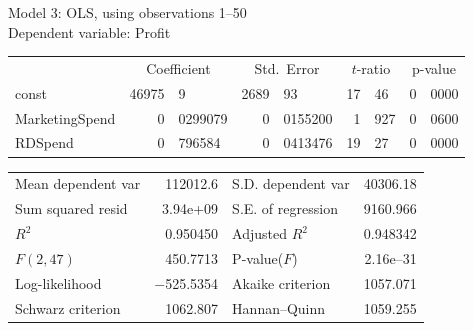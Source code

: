 \documentclass[11pt]{article}
\begin{document}
\thispagestyle{empty}

\begin{center}

Model 3: OLS, using observations 1--50\\
Dependent variable: Profit\\

\vspace{1em}

\begin{tabular}{lr@{.}lr@{.}lr@{.}lr@{.}l}
  &
 \multicolumn{2}{c}{Coefficient} &
  \multicolumn{2}{c}{Std.\ Error} &
   \multicolumn{2}{c}{$t$-ratio} &
    \multicolumn{2}{c}{p-value} \\[1ex]
const &
  46975&9 &
    2689&93 &
      17&46 &
        0&0000 \\
MarketingSpend &
  0&0299079 &
    0&0155200 &
      1&927 &
        0&0600 \\
RDSpend &
  0&796584 &
    0&0413476 &
      19&27 &
        0&0000 \\
\end{tabular}

\vspace{1ex}
\begin{tabular}{lrlr}
Mean dependent var &  112012.6 & S.D. dependent var &  40306.18 \\
Sum squared resid &  3.94\textrm{e+09} & S.E. of regression &  9160.966 \\
$R^2$ &  0.950450 & Adjusted $R^2$ &  0.948342 \\
$F(2, 47)$ &  450.7713 & P-value($F$) &  2.16\textrm{e--31} \\
Log-likelihood & $-$525.5354 & Akaike criterion &  1057.071 \\
Schwarz criterion &  1062.807 & Hannan--Quinn &  1059.255 \\
\end{tabular}


\end{center}
\end{document}
